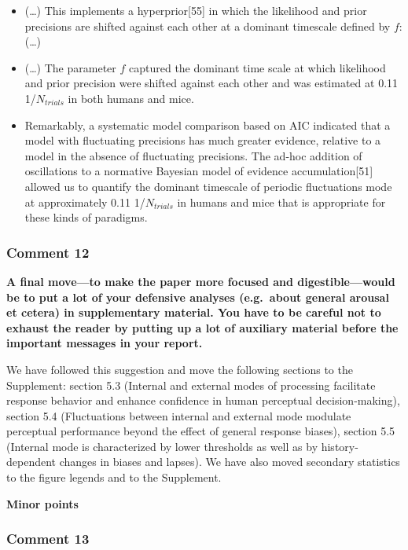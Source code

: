 \documentclass[
]{article}
\begin{document}
\begin{itemize}
\item
  (\ldots) This implements a hyperprior{[}55{]} in which the likelihood
  and prior precisions are shifted against each other at a dominant
  timescale defined by \(f\): (\ldots)
\item
  (\ldots) The parameter \(f\) captured the dominant time scale at which
  likelihood and prior precision were shifted against each other and was
  estimated at 0.11 1/\(N_{trials}\) in both humans and mice.
\item
  Remarkably, a systematic model comparison based on AIC indicated that
  a model with fluctuating precisions has much greater evidence,
  relative to a model in the absence of fluctuating precisions. The
  ad-hoc addition of oscillations to a normative Bayesian model of
  evidence accumulation{[}51{]} allowed us to quantify the dominant
  timescale of periodic fluctuations mode at approximately 0.11
  1/\(N_{trials}\) in humans and mice that is appropriate for these
  kinds of paradigms.
\end{itemize}

\hypertarget{comment-12}{%
\subsubsection{Comment 12}\label{comment-12}}

\textbf{A final move---to make the paper more focused and
digestible---would be to put a lot of your defensive analyses
(e.g.~about general arousal et cetera) in supplementary material. You
have to be careful not to exhaust the reader by putting up a lot of
auxiliary material before the important messages in your report.}

We have followed this suggestion and move the following sections to the
Supplement: section 5.3 (Internal and external modes of processing
facilitate response behavior and enhance confidence in human perceptual
decision-making), section 5.4 (Fluctuations between internal and
external mode modulate perceptual performance beyond the effect of
general response biases), section 5.5 (Internal mode is characterized by
lower thresholds as well as by history-dependent changes in biases and
lapses). We have also moved secondary statistics to the figure legends
and to the Supplement.

\textbf{Minor points}

\hypertarget{comment-13}{%
\subsubsection{Comment 13}\label{comment-13}}
\end{document}
